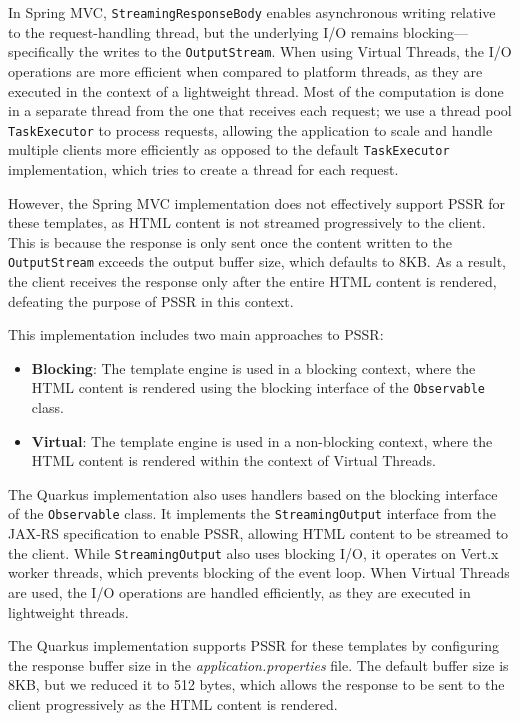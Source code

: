 In Spring MVC, \texttt{StreamingResponseBody} enables asynchronous writing
relative to the request-handling thread, but the underlying I/O remains
blocking—specifically the writes to the \texttt{OutputStream}. When using
Virtual Threads, the I/O operations are more efficient when compared to
platform threads, as they are executed in the context of a lightweight thread.
Most of the computation is done in a separate thread from the one that receives
each request; we use a thread pool \texttt{TaskExecutor} to process requests,
allowing the application to scale and handle multiple clients more efficiently
as opposed to the default \texttt{TaskExecutor} implementation, which tries to
create a thread for each request.

However, the Spring MVC implementation does not effectively support PSSR for
these templates, as HTML content is not streamed progressively to the client.
This is because the response is only sent once the content written to the
\texttt{OutputStream} exceeds the output buffer size, which defaults to 8KB\@.
As a result, the client receives the response only after the entire HTML
content is rendered, defeating the purpose of PSSR in this context.

This implementation includes two main approaches to PSSR\@:
\begin{itemize}
      \item \textbf{Blocking}: The template engine is used in a blocking context,
            where the HTML content is rendered using the blocking interface of the
            \texttt{Observable} class.
      \item \textbf{Virtual}: The template engine is used in a non-blocking context,
            where the HTML content is rendered within the context of Virtual Threads.
\end{itemize}

The Quarkus implementation also uses handlers based on the blocking interface
of the \texttt{Observable} class. It implements the \texttt{StreamingOutput}
interface from the JAX-RS specification to enable PSSR, allowing HTML content
to be streamed to the client. While \texttt{StreamingOutput} also uses blocking
I/O, it operates on Vert.x worker threads, which prevents blocking of the event
loop. When Virtual Threads are used, the I/O operations are handled
efficiently, as they are executed in lightweight threads.

The Quarkus implementation supports PSSR for these templates by configuring the
response buffer size in the \textit{application.properties} file. The default
buffer size is 8KB, but we reduced it to 512 bytes, which allows the response
to be sent to the client progressively as the HTML content is rendered.

